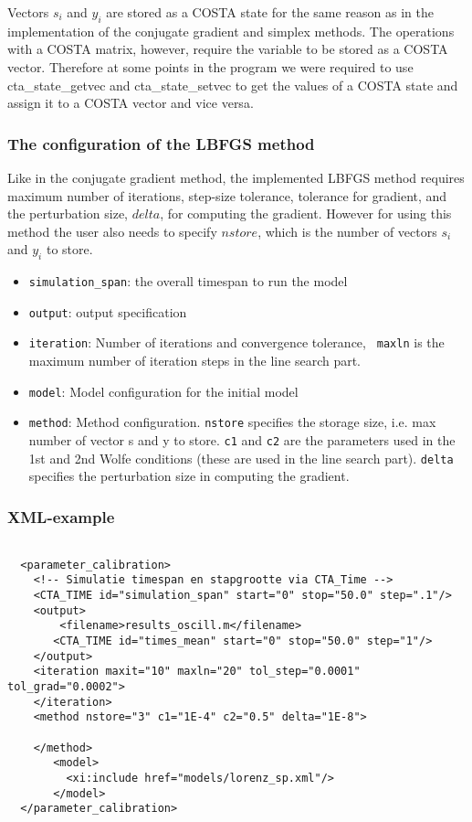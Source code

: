 \documentclass[a4paper,12pt]{article}
\begin{document}
Vectors $s_i$ and $y_i$ are stored as a COSTA state for the same reason as in
the implementation of the conjugate gradient and simplex methods. The
operations with a COSTA matrix, however, require the variable to be stored as a 
COSTA vector. Therefore at some points in the program we were required to
use cta\_state\_getvec and cta\_state\_setvec to get the values of a COSTA
state and assign it to a COSTA vector and vice versa.

\subsubsection{The configuration of the LBFGS method}

Like in the conjugate gradient method, the implemented LBFGS method
requires maximum number of iterations, step-size tolerance, tolerance for
gradient, and the perturbation size, $delta$, for computing the gradient.
However for using this method the user also needs to specify $nstore$,
which is the number of vectors $s_i$ and $y_i$ to store.

\begin{itemize}
\item {\tt simulation\_span}: the overall timespan to run the model
\item {\tt output}: output specification
\item {\tt iteration}: Number of iterations and convergence tolerance, {\tt
  maxln} is the maximum number of iteration steps in the line search part.
\item {\tt model}: Model configuration for the initial model
\item {\tt method}: Method configuration.
    {\tt nstore} specifies the storage size, i.e. max number of vector s and y to store.
    {\tt c1} and {\tt c2} are the parameters used in the 1st and 2nd Wolfe
    conditions (these are used in the line search part). 
    {\tt delta} specifies the perturbation size in computing the gradient.
\end{itemize}


\subsubsection{XML-example}
\begin{verbatim}

  <parameter_calibration>
    <!-- Simulatie timespan en stapgrootte via CTA_Time -->
    <CTA_TIME id="simulation_span" start="0" stop="50.0" step=".1"/>
    <output>
        <filename>results_oscill.m</filename> 
       <CTA_TIME id="times_mean" start="0" stop="50.0" step="1"/>
    </output>
    <iteration maxit="10" maxln="20" tol_step="0.0001" tol_grad="0.0002">
    </iteration>
    <method nstore="3" c1="1E-4" c2="0.5" delta="1E-8">

    </method>
       <model>
         <xi:include href="models/lorenz_sp.xml"/>
       </model>
  </parameter_calibration>


 
\end{verbatim}
\end{document}
